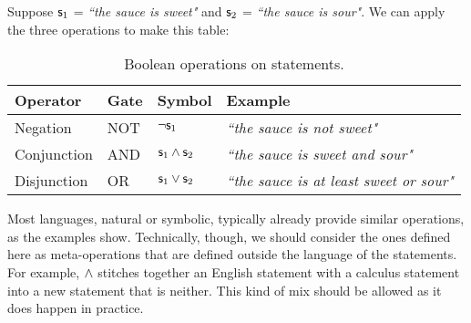 \documentclass[11pt,letterpaper,fleqn]{memoir} %
\begin{document}
Suppose $\mathsf{s}_1$ = \emph{``the sauce is sweet"} and $\mathsf{s}_2$ = \emph{``the sauce is sour"}. We can apply the three operations to make this table:

\begin{table}[h]
	\centering
	\begin{tabular}{p{} p{} p{} p{}}
		Operator & Gate & Symbol & Example \\ 
		\hline 
		Negation & NOT & $\neg \mathsf{s}_1$ &  \emph{``the sauce is not sweet"} \\ 
		Conjunction & AND & $\mathsf{s}_1 \wedge \mathsf{s}_2$ & \emph{``the sauce is sweet and sour"} \\ 
		Disjunction & OR & $\mathsf{s}_1 \vee \mathsf{s}_2$ & \emph{``the sauce is at least sweet or sour"}
	\end{tabular} 
	\caption{Boolean operations on statements.}
\end{table}

Most languages, natural or symbolic, typically already provide similar operations, as the examples show. Technically, though, we should consider the ones defined here as meta-operations that are defined outside the language of the statements. For example, $\wedge$ stitches together an English statement with a calculus statement into a new statement that is neither. This kind of mix should be allowed as it does happen in practice.
\end{document}
